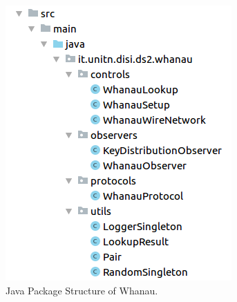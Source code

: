 \begin{figure}[h]
    \centering
    \includegraphics[scale=0.4]{package_structure.png}
    \caption{Java Package Structure of Whanau.}
    \label{fig:package_structure}
\end{figure}